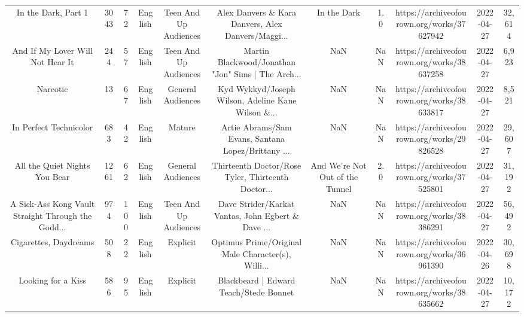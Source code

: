 \begin{table}[h!]
{\begin{tabular}{|c|c|c|c|c|c|c|c|c|c|c|}
                               In the Dark, Part 1 &   3043 &    72 &  English & Teen And Up Audiences & Alex Danvers \& Kara Danvers, Alex Danvers/Maggi... &                                        In the Dark &   1.0 & https://archiveofourown.org/works/37627942 & 2022-04-27 &    32,614 \\
                  And If My Lover Will Not Hear It &    244 &    57 &  English & Teen And Up Audiences & Martin Blackwood/Jonathan "Jon" Sims | The Arch... &                                                NaN &   NaN & https://archiveofourown.org/works/38637258 & 2022-04-27 &     6,923 \\
                                          Narcotic &     13 &    67 &  English &     General Audiences & Kyd Wykkyd/Joseph Wilson, Adeline Kane Wilson \&... &                                                NaN &   NaN & https://archiveofourown.org/works/38633817 & 2022-04-27 &     8,521 \\
                            In Perfect Technicolor &    683 &    42 &  English &                Mature & Artie Abrams/Sam Evans, Santana Lopez/Brittany ... &                                                NaN &   NaN & https://archiveofourown.org/works/29826528 & 2022-04-27 &    29,607 \\
                     All the Quiet Nights You Bear &   1261 &    62 &  English &     General Audiences & Thirteenth Doctor/Rose Tyler, Thirteenth Doctor... &                    And We're Not Out of the Tunnel &   2.0 & https://archiveofourown.org/works/37525801 & 2022-04-27 &    31,192 \\
A Sick-Ass Kong Vault Straight Through the Godd... &    974 &   100 &  English & Teen And Up Audiences & Dave Strider/Karkat Vantas, John Egbert \& Dave ... &                                                NaN &   NaN & https://archiveofourown.org/works/38386291 & 2022-04-27 &    56,492 \\
                             Cigarettes, Daydreams &    508 &    22 &  English &              Explicit & Optimus Prime/Original Male Character(s), Willi... &                                                NaN &   NaN & https://archiveofourown.org/works/36961390 & 2022-04-26 &    30,698 \\
                                Looking for a Kiss &    586 &    95 &  English &              Explicit &             Blackbeard | Edward Teach/Stede Bonnet &                                                NaN &   NaN & https://archiveofourown.org/works/38635662 & 2022-04-27 &    10,172 \\

\end{tabular}}
\end{table}
